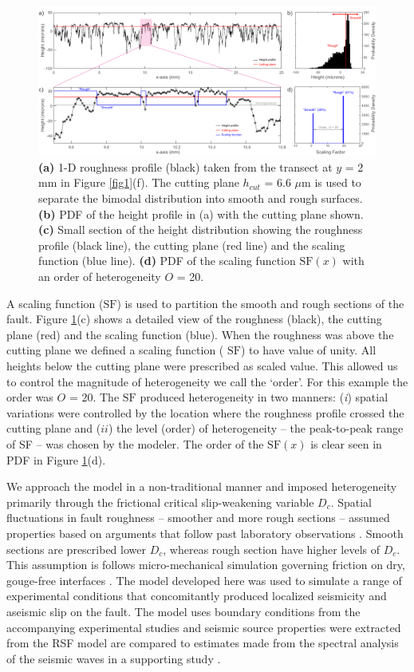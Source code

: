 \documentclass[preprint,1p, 10pt,authoryear]{elsarticle}
\begin{document}
\begin{figure}[ht]
	\centering
	\includegraphics{FIG3.pdf} 
	\caption{ \textbf{(a)} 1-D roughness profile (black) taken from the transect at $y$ = 2 mm in Figure \ref{fig1}(f).  The cutting plane $h_{cut}$ = 6.6 $\mu$m is used to separate the bimodal distribution into smooth and rough surfaces. \textbf{(b)} PDF of the height profile in (a) with the cutting plane shown. \textbf{(c)} Small section of the height distribution showing the roughness profile (black line), the cutting plane (red line) and the scaling function (blue line). \textbf{(d)} PDF of the scaling function $\mathrm{SF}(x)$ with an order of heterogeneity $O$ = 20.}
	\label{fig3}
\end{figure}

A scaling function ($\mathrm{SF}$) is used to partition the smooth and rough sections of the fault. Figure \ref{fig3}(c) shows a detailed view of the roughness (black), the cutting plane (red) and the scaling function (blue). When the roughness was above the cutting plane we defined a scaling function ( $\mathrm{SF}$) to have value of unity. All heights below the cutting plane were prescribed as scaled value. This allowed us to control the magnitude of heterogeneity we call the `order'. For this example the order was $O$ = 20. The  $\mathrm{SF}$ produced heterogeneity in two manners: (\textit{i}) spatial variations were controlled by the location where the roughness profile crossed the cutting plane and ($ii$) the level (order) of heterogeneity -- the peak-to-peak range of SF -- was chosen by the modeler. The order of the $\mathrm{SF}(x)$ is clear seen in PDF in Figure \ref{fig3}(d).

We approach the model in a non-traditional manner and imposed heterogeneity primarily through the frictional critical slip-weakening variable $D_{c}$. Spatial fluctuations in fault roughness -- smoother and more rough sections -- assumed properties based on arguments that follow past laboratory observations \citep{Dieterich1981, Marone1973, Marone1994}. Smooth sections are prescribed lower $D_{c}$, whereas rough section have higher levels of $D_{c}$. This assumption is follows micro-mechanical simulation governing friction on dry, gouge-free interfaces \citep{Yoshioka1996}. The model developed here was used to simulate a range of experimental conditions that concomitantly produced localized seismicity and aseismic slip on the fault. The model uses boundary conditions from the accompanying experimental studies and seismic source properties were extracted from the RSF  model are compared to estimates made from the spectral analysis of the seismic waves in a supporting study \citep{Selvadurai2019}.
\end{document}
